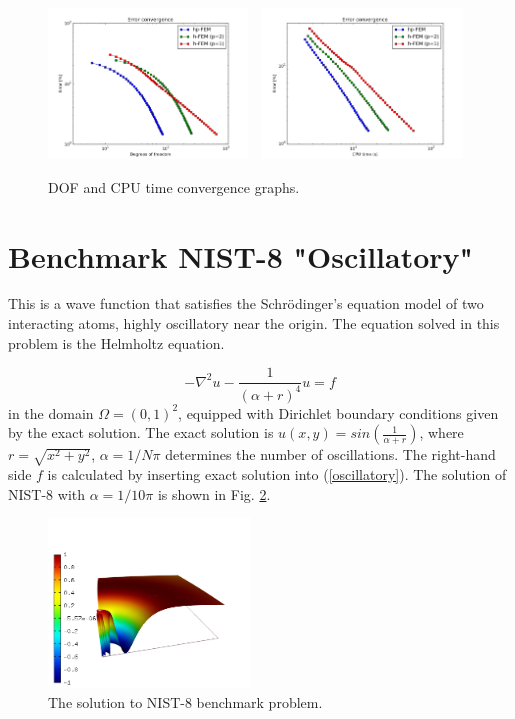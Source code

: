 \documentclass[12pt]{elsarticle}
\begin{document}
\begin{figure}[H]
\centering
\includegraphics[height=4cm]{nist/nist-7/conv_dof_aniso.png}\ \
\includegraphics[height=4cm]{nist/nist-7/conv_cpu_aniso.png}
\caption{DOF and CPU time convergence graphs.}
\label{fig:nist-7-conv}
\end{figure}


\section{Benchmark NIST-8 "Oscillatory"}
\label{sec:bench-8}

This is a wave function that satisfies the Schr\"{o}dinger's equation model of two
interacting atoms, highly oscillatory near the origin.
The equation solved in this problem is the Helmholtz equation.

\begin{equation} \label{oscillatory}
-\nabla^{2} u - \frac{1}{(\alpha + r)^{4}} u = f
\end{equation}
in the domain $\Omega = (0, 1)^2$, equipped with Dirichlet boundary conditions
given by the exact solution. The exact solution is
$u(x,y) = sin(\frac{1}{\alpha + r})$,
where $r = \sqrt{x^{2} + y^{2}}$, $\alpha = 1 / N \pi$ determines the number of oscillations.
The right-hand side $f$ is calculated by inserting exact solution into (\ref{oscillatory}).
The solution of NIST-8 with $\alpha = 1 / 10 \pi$ is shown in Fig. \ref{fig:sln-nist08}.

\begin{figure}[!ht]
\centering
\vspace{-5mm}
\includegraphics[height=4.5cm]{nist/nist-8/solution.png}
\vspace{-4mm}
\caption{The solution to NIST-8 benchmark problem.}
\label{fig:sln-nist08}
\end{figure}
\end{document}
